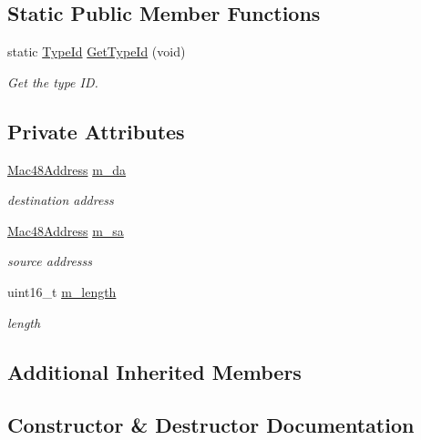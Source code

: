 \subsection*{Static Public Member Functions}
\begin{DoxyCompactItemize}
\item 
static \hyperlink{classns3_1_1TypeId}{Type\+Id} \hyperlink{classns3_1_1AmsduSubframeHeader_a277fcdf431efe560a55903cbff9dc7dd}{Get\+Type\+Id} (void)
\begin{DoxyCompactList}\small\item\em Get the type ID. \end{DoxyCompactList}\end{DoxyCompactItemize}
\subsection*{Private Attributes}
\begin{DoxyCompactItemize}
\item 
\hyperlink{classns3_1_1Mac48Address}{Mac48\+Address} \hyperlink{classns3_1_1AmsduSubframeHeader_a793d99a78d90657d3c38db92747f969b}{m\+\_\+da}
\begin{DoxyCompactList}\small\item\em destination address \end{DoxyCompactList}\item 
\hyperlink{classns3_1_1Mac48Address}{Mac48\+Address} \hyperlink{classns3_1_1AmsduSubframeHeader_a5a466a28217906fb51eef59c1aa75e9b}{m\+\_\+sa}
\begin{DoxyCompactList}\small\item\em source addresss \end{DoxyCompactList}\item 
uint16\+\_\+t \hyperlink{classns3_1_1AmsduSubframeHeader_a65dd60738ed7dae4bb4157dd05441ec1}{m\+\_\+length}
\begin{DoxyCompactList}\small\item\em length \end{DoxyCompactList}\end{DoxyCompactItemize}
\subsection*{Additional Inherited Members}


\subsection{Constructor \& Destructor Documentation}
